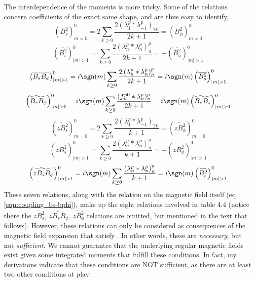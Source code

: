 The interdependence of the moments is more tricky. Some of the relations concern coefficients of the exact same shape, and are thus easy to identify,
\begin{equation}\label{eqn:coupling_bss-bpp_m0}
    \left(\overline{B_s^2}\right)_{m=0}^{0} = 2 \sum_{k\geq 0} \frac{2 (\lambda_1^p * \lambda_{-1}^p)_{2k}}{2k+1} = \left(\overline{B_\phi^2}\right)_{m=0}^0
\end{equation}
\begin{equation}\label{eqn:coupling_bss-bpp_mg1}
    \left(\overline{B_s^2}\right)_{|m|>1}^{0} = \sum_{k\geq 0} \frac{2 \left(\lambda_n^p * \lambda_n^p\right)_{n}^{p}}{2k+1} = - \left(\overline{B_\phi^2}\right)_{|m|>1}^0
\end{equation}
\begin{equation}\label{eqn:coupling_bsp-bss_mg1}
    \left(\overline{B_sB_\phi}\right)_{|m|>1}^{0} = i\sgn(m)\sum_{k\geq 0} \frac{2 \left(\lambda_n^p * \lambda_n^p\right)_{n}^{p}}{2k+1} = i\sgn(m) \left(\overline{B_s^2}\right)_{|m|>1}^0
\end{equation}
\begin{equation}\label{eqn:coupling_bzp-bzs_mg0}
    \left(\widetilde{B_zB_\phi}\right)_{|m|>0}^{0} = i\sgn(m) \sum_{k\geq 0} \frac{ (f_n^{p0} * \lambda_n^p)_n^p}{2k+1} = i \sgn(m) \left(\widetilde{B_z B_s}\right)_{|m|>0}^0
\end{equation}
\begin{equation}\label{eqn:coupling_bzss-bzpp_m0}
    \left(\widetilde{zB_s^2}\right)_{m=0}^{0} = 2 \sum_{k\geq 0} \frac{2 (\lambda_1^p * \lambda_{-1}^p)_{2k}}{k+1} = \left(\widetilde{zB_\phi^2}\right)_{m=0}^0
\end{equation}
\begin{equation}\label{eqn:coupling_bzss-bzpp_mg1}
    \left(\widetilde{zB_s^2}\right)_{|m|>1}^{0} = \sum_{k\geq 0} \frac{2 \left(\lambda_n^p * \lambda_n^p\right)_{n}^{p}}{k+1} = - \left(\widetilde{zB_\phi^2}\right)_{|m|>1}^0
\end{equation}
\begin{equation}\label{eqn:coupling_bzsp-bss_mg1}
    \left(\widetilde{zB_sB_\phi}\right)_{|m|>1}^{0} = i\sgn(m)\sum_{k\geq 0} \frac{\left(\lambda_n^p * \lambda_n^p\right)_{n}^{p}}{k+1} = i\sgn(m) \left(\widetilde{B_s^2}\right)_{|m|>1}^0
\end{equation}
These seven relations, along with the relation on the magnetic field itself (eq.\ref{eqn:coupling_bs-bphi}), make up the eight relations involved in \textcite{holdenried-chernoff_long_2021} table 4.4 (notice there the $\widetilde{zB_s^2}$, $\widetilde{zB_sB_\phi}$, $\widetilde{zB_\phi^2}$ relations are omitted, but mentioned in the text that follows). However, these relations can only be considered as consequences of the magnetic field expansion that satisfy \textcite{lewis_physical_1990}. In other words, these are \textit{necessary}, but not \textit{sufficient}. We cannot guarantee that the underlying regular magnetic fields exist given some integrated moments that fulfill these conditions. In fact, my derivations indicate that these conditions are NOT sufficient, as there are at least two other conditions at play:
